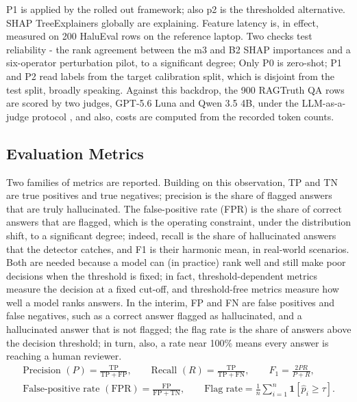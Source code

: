\documentclass[a4paper,fleqn]{cas-sc}
\begin{document}
P1 is applied by the rolled out framework; also p2 is the thresholded alternative. SHAP \cite{shap} TreeExplainers globally are explaining. Feature latency is, in effect, measured on 200 HaluEval rows on the reference laptop. Two checks test reliability - the rank agreement between the m3 and B2 SHAP importances and a six-operator perturbation pilot, to a significant degree; Only P0 is zero-shot; P1 and P2 read labels from the target calibration split, which is disjoint from the test split, broadly speaking. Against this backdrop, the 900 RAGTruth QA rows are scored by two judges, GPT-5.6 Luna and Qwen 3.5 4B, under the LLM-as-a-judge protocol \cite{zheng2023judge}, and also, costs are computed from the recorded token counts.

\subsection{Evaluation Metrics}

Two families of metrics are reported. Building on this observation, TP and TN are true positives and true negatives; precision is the share of flagged answers that are truly hallucinated. The false-positive rate (FPR) is the share of correct answers that are flagged, which is the operating constraint, under the distribution shift, to a significant degree; indeed, recall is the share of hallucinated answers that the detector catches, and F1 is their harmonic mean, in real-world scenarios. Both are needed because a model can (in practice) rank well and still make poor decisions when the threshold is fixed; in fact, threshold-dependent metrics measure the decision at a fixed cut-off, and threshold-free metrics measure how well a model ranks answers. In the interim, FP and FN are false positives and false negatives, such as a correct answer flagged as hallucinated, and a hallucinated answer that is not flagged; the flag rate is the share of answers above the decision threshold; in turn, also, a rate near 100\% means every answer is reaching a human reviewer.
\begin{gather}
  \text{Precision }(P) = \frac{\mathrm{TP}}{\mathrm{TP} + \mathrm{FP}}, \qquad
  \text{Recall }(R) = \frac{\mathrm{TP}}{\mathrm{TP} + \mathrm{FN}}, \qquad
  F_1 = \frac{2PR}{P+R}, \\
  \text{False-positive rate }(\mathrm{FPR}) = \frac{\mathrm{FP}}{\mathrm{FP} + \mathrm{TN}}, \qquad
  \text{Flag rate} = \frac{1}{n}\sum_{i=1}^{n}\mathbf{1}[\hat{p}_i \ge \tau].
\end{gather}
\end{document}
